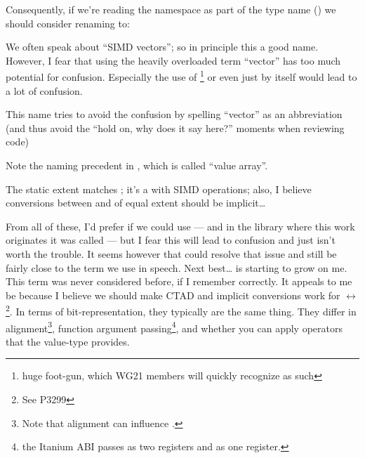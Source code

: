 Consequently, if we're reading the namespace as part of the type name
() we should consider renaming  to:
\begin{list}{}{
  \setlength{\topsep}{0pt}%
  \setlength{\leftmargin}{7em}%
  \setlength{\rightmargin}{0pt}%
  \setlength{\labelwidth}{7em}%
}

  \item[\code{simd::vector}]
    We often speak about “SIMD vectors”; so in principle this a good name.
    However, I fear that using the heavily overloaded term “vector” has too
    much potential for confusion.
    Especially the use of \footnote{huge foot-gun, which WG21 members will quickly
    recognize as such} or even just  by
    itself would lead to a lot of confusion.

  \item[\code{simd::vec}]
    This name tries to avoid the confusion by spelling “vector” as an
    abbreviation (and thus avoid the “hold on, why does it say 
    here?” moments when reviewing code)

  \item[\code{simd::value}]
    Note the naming precedent in , which is called “value
    array”.

  \item[\code{simd::values}]

  \item[\code{simd::array}]
    The static extent matches \std{}; it's a \std{} with
    SIMD operations; also, I believe conversions between  and
    \std{} of equal extent should be implicit\ldots
\end{list}

From all of these, I'd prefer if we could use  --- and
in the library where this work originates it was called 
--- but I fear this will lead to confusion and just isn't worth the trouble.
It seems however that  could resolve that issue and still
be fairly close to the term we use in speech.
Next best\ldots{}  is starting to grow on me.
This term was never considered before, if I remember correctly.
It appeals to me be because I believe we should make CTAD and implicit
conversions work for  $\leftrightarrow$ \footnote{See P3299}.
In terms of bit-representation, they typically are the same thing.
They differ in alignment\footnote{Note that alignment can influence
.}, function argument passing\footnote{\Eg the Itanium ABI passes
   as two  registers and 
as one  register.}, and whether you can apply operators that the
value-type provides.

